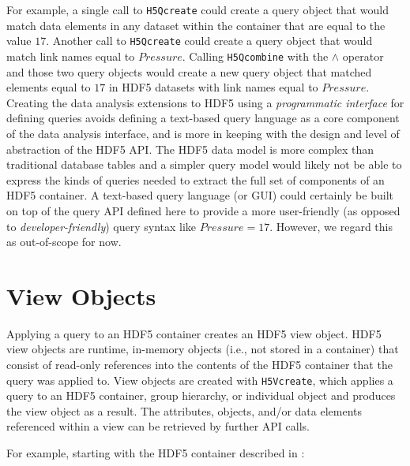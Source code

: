 \documentclass[letterpaper,hyper]{THG_RFC}
\begin{document}
For example, a single call to \texttt{H5Qcreate} could create a query object
that would match data elements in any dataset within the container that are
equal to the value $17$. Another call to \texttt{H5Qcreate} could create a
query object that would match link names equal to $Pressure$.
Calling \texttt{H5Qcombine} with the $\land$ operator and those two query
objects would create a new query object that matched elements equal to $17$
in HDF5 datasets with link names equal to $Pressure$.
Creating the data analysis extensions to HDF5 using a \textit{programmatic
interface} for defining queries avoids defining a text-based query language
as a core component of the data analysis interface, and is more in keeping with
the design and level of abstraction of the HDF5 API.
The HDF5 data model is more complex than traditional database tables and a
simpler query model would likely not be able to express the kinds of queries
needed to extract the full set of components of an HDF5 container. A text-based
query language (or GUI) could certainly be built on top of the query API
defined here to provide a more user-friendly (as opposed to
\textit{developer-friendly}) query syntax like $Pressure = 17$. However, we
regard this as out-of-scope for now.


\section{View Objects}
Applying a query to an HDF5 container creates an HDF5 view object. HDF5 view
objects are runtime, in-memory objects (i.e., not stored in a container) that
consist of read-only references into the contents of the HDF5 container that
the query was applied to. View objects are created with \texttt{H5Vcreate},
which applies a query to an HDF5 container, group hierarchy, or individual
object and produces the view object as a result. The attributes, objects,
and/or data elements referenced within a view can be retrieved by further API
calls.

For example, starting with the HDF5 container described in
:
\end{document}
